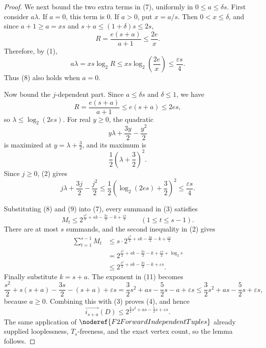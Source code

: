 \begin{proof}
We next bound the two extra terms in (7), uniformly in \(0\le a\le\delta s\). First consider \(a\lambda\). If \(a=0\), this term is \(0\). If \(a>0\), put \(x=a/s\). Then \(0<x\le\delta\), and since \(a+1\ge a=xs\) and \(s+a\le(1+\delta)s\le2s\),
\[
  R=\frac{e(s+a)}{a+1}
  \le \frac{2e}{x}.
\]
Therefore, by (1),
\[
  a\lambda
  =xs\log_2 R
  \le xs\log_2\left(\frac{2e}{x}\right)
  \le \frac{\varepsilon s}{4}. \tag{8}
\]
Thus (8) also holds when \(a=0\).

Now bound the \(j\)-dependent part. Since \(a\le\delta s\) and \(\delta\le1\), we have
\[
  R=\frac{e(s+a)}{a+1}\le e(s+a)\le2es,
\]
so \(\lambda\le\log_2(2es)\). For real \(y\ge0\), the quadratic
\[
  y\lambda+\frac{3y}{2}-\frac{y^2}{2}
\]
is maximized at \(y=\lambda+\frac32\), and its maximum is
\[
  \frac12\left(\lambda+\frac32\right)^2.
\]
Since \(j\ge0\), (2) gives
\[
  j\lambda+\frac{3j}{2}-\frac{j^2}{2}
  \le
  \frac12\left(\log_2(2es)+\frac32\right)^2
  \le \frac{\varepsilon s}{4}. \tag{9}
\]

Substituting (8) and (9) into (7), every summand in (3) satisfies
\[
  M_t\le
  2^{\frac{s^2}{2}+sk-\frac{3s}{2}-k+\frac{\varepsilon s}{2}}
  \qquad(1\le t\le s-1). \tag{10}
\]
There are at most \(s\) summands, and the second inequality in (2) gives
\[
\begin{aligned}
  \sum_{t=1}^{s-1}M_t
  &\le
  s\cdot
  2^{\frac{s^2}{2}+sk-\frac{3s}{2}-k+\frac{\varepsilon s}{2}}  \\
  &=
  2^{\frac{s^2}{2}+sk-\frac{3s}{2}-k+\frac{\varepsilon s}{2}+\log_2 s} \\
  &\le
  2^{\frac{s^2}{2}+sk-\frac{3s}{2}-k+\varepsilon s}.
\end{aligned} \tag{11}
\]
Finally substitute \(k=s+a\). The exponent in (11) becomes
\[
  \frac{s^2}{2}+s(s+a)-\frac{3s}{2}-(s+a)+\varepsilon s
  =
  \frac32s^2+as-\frac52s-a+\varepsilon s
  \le
  \frac32s^2+as-\frac52s+\varepsilon s,
\]
because \(a\ge0\). Combining this with (3) proves (4), and hence
\[
  \overrightarrow{i_{s+a}}(D)\le
  2^{\frac32s^2+as-\frac52s+\varepsilon s}.
\]
The same application of \(\noderef{F2ForwardIndependentTuples}\) already supplied looplessness, \(T_s\)-freeness, and the exact vertex count, so the lemma follows.
\end{proof}
